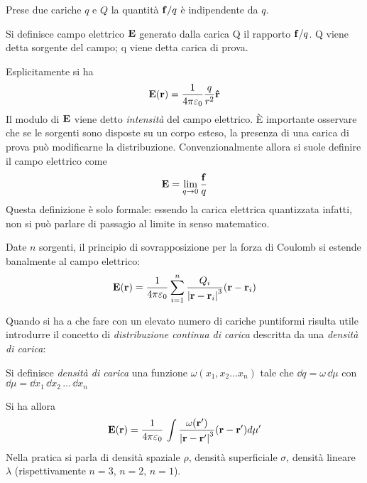 Prese due cariche $q$ e $Q$ la quantità $\vb{f}/q$ è indipendente da $q$.
\begin{defn}
    Si definisce campo elettrico $\vb{E}$ generato dalla carica Q il rapporto $\vb{f}/q$. Q viene detta sorgente del
    campo; q viene detta carica di prova.
\end{defn}
Esplicitamente si ha
\begin{equation}
    \vb{E}(\vb{r})=\frac{1}{4\pi\varepsilon_0}\frac{q}{r^2}\vu{r}
    \label{eqn:E}
\end{equation}
Il modulo di $\vb{E}$ viene detto \textit{intensità} del campo elettrico.
È importante osservare che se le sorgenti sono disposte su un corpo esteso, la presenza di una carica di prova può
modificarne la distribuzione. Convenzionalmente allora si suole definire il campo elettrico come
\[
    \vb{E}=\lim_{q\to 0}\frac{\vb{f}}{q}
\]
Questa definizione è solo formale: essendo la carica elettrica quantizzata infatti, non si può parlare di passagio
al limite in senso matematico.
\begin{obs}
    Date $n$ sorgenti, il principio di sovrapposizione per la forza di Coulomb si estende banalmente al campo elettrico:
    \[
        \vb{E}(\vb{r})=\frac{1}{4\pi\varepsilon_0}\sum_{i=1}^n \frac{Q_i}{\abs{\vb{r}-\vb{r}_i}^3}(\vb{r}-\vb{r}_i)
    \]
\end{obs}

Quando si ha a che fare con un elevato numero di cariche puntiformi risulta utile introdurre il concetto di \textit
{distribuzione continua di carica} descritta da una \textit{densità di carica}:
\begin{defn}
    Si definisce \textit{densità di carica} una funzione $\omega(x_1,x_2\ldots x_n)$ tale che $\dd{q}=\omega\,\dd{\mu}$ con
    $\dd{\mu}=\dd{x_1}\,\dd{x_2}\,\ldots\,\dd{x_n}$
\end{defn}
Si ha allora
\begin{equation}
    \label{eqn:E_distribuzione}
    \vb{E}(\vb{r})=\frac{1}{4\pi\varepsilon_0}\,\int\frac{\omega(\vb{r'})}{\abs{\vb{r}-\vb{r'}}^3}(\vb{r}-\vb{r'})d\mu'
\end{equation}
Nella pratica si parla di densità spaziale $\rho$, densità superficiale $\sigma$, densità lineare $\lambda$
(rispettivamente $n=3$, $n=2$, $n=1$).
